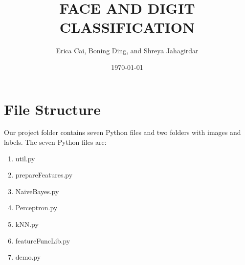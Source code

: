 \documentclass{article}
\title{FACE AND DIGIT CLASSIFICATION} %
\author{Erica Cai, Boning Ding, and Shreya Jahagirdar} %
\date{\today} %
\begin{document}
\maketitle %




\section{File Structure}

Our project folder contains seven Python files and two folders with images and labels. The seven Python files are:
\begin{enumerate}
	\item util.py
	\item prepareFeatures.py
	\item NaiveBayes.py
	\item Perceptron.py
	\item kNN.py
	\item featureFuncLib.py
	\item demo.py
\end{enumerate}
\end{document}
